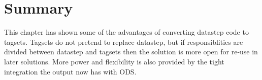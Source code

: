 \section{Summary}
This chapter has shown some of the advantages of converting datastep code
to tagsets.  Tagsets do not pretend to replace datastep, but if responsiblities
are divided between datastep and tagsets then the solution is more open for 
re-use in later solutions.  More power and flexibility is also provided by the
tight integration the output now has with ODS.

